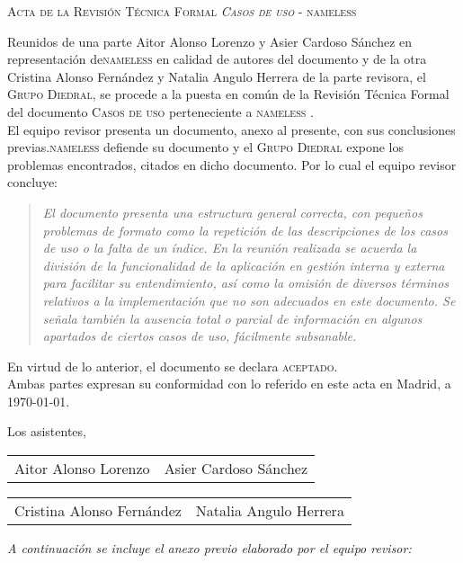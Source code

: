 \documentclass[11pt, a4paper, twoside]{article}
\newcommand*{\nameless}{\mbox{\textsc{nameless}} }
\begin{document}
	\begin{center}
		\scshape \large Acta de la Revisión Técnica Formal \textit{Casos de uso} - \nameless
	\end{center}

	Reunidos de una parte Aitor Alonso Lorenzo y Asier Cardoso Sánchez en representación de\break \nameless en calidad de autores del documento y de la otra Cristina Alonso Fernández y Natalia Angulo Herrera de la parte revisora, el \textsc{Grupo Diedral}, se procede a la puesta en común de la Revisión Técnica Formal del documento \textsc{Casos de uso} perteneciente a \nameless. \\

	El equipo revisor presenta un documento, anexo al presente, con sus conclusiones previas.\break \nameless defiende su documento y el \textsc{Grupo Diedral} expone los problemas encontrados, citados en dicho documento. Por lo cual el equipo revisor concluye:

\begin{quotation} \itshape
	El documento presenta una estructura general correcta, con pequeños problemas de formato como la repetición de las descripciones de los casos de uso o la falta de un índice. En la reunión realizada se acuerda la división de la funcionalidad de la aplicación en gestión interna y externa para facilitar su entendimiento, así como la omisión de diversos términos relativos a la implementación que no son adecuados en este documento. Se señala también la ausencia total o parcial de información en algunos apartados de ciertos casos de uso, fácilmente subsanable.
\end{quotation}

\noindent
En virtud de lo anterior, el documento se declara \textsc{aceptado}.\\

	Ambas partes expresan su conformidad con lo referido en este acta en Madrid, a \today.

\begin{flushleft}
	Los asistentes,
\end{flushleft}

\vspace{1cm}

	\begin{tabu} to .9\linewidth {X[1,c] X[1, c]}
		Aitor Alonso Lorenzo & Asier Cardoso Sánchez
	\end{tabu}

	\vfill

	\begin{tabu} to .9\linewidth {X[1,c] X[1, c]}
		Cristina Alonso Fernández & Natalia Angulo Herrera
	\end{tabu}
	
	\vfill
	{\itshape A continuación se incluye el anexo previo elaborado por el equipo revisor: }

	
\end{document}
